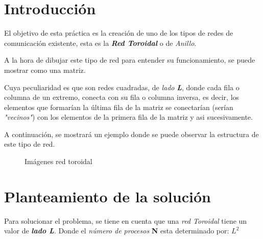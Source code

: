 \documentclass[11pt]{article}
\begin{document}
\section{Introducción}
El objetivo de esta práctica es la creación de uno de los tipos de redes de comunicación existente, esta es la \textbf{\textit{Red Toroidal}} \cite{transpas} o de \textit{Anillo}.

A la hora de dibujar este tipo de red para entender su funcionamiento, se puede mostrar como una matriz. 

Cuya peculiaridad es que son redes cuadradas, de \textit{lado} \textit{\textbf{L}}, donde cada fila o columna de un extremo, conecta con su fila o columna inversa, es decir, los elementos que formarían la última fila de la matriz se conectarían (serían \textit{"vecinos"}) con los elementos de la primera fila de la matriz y asi sucesivamente.

A continuación, se mostrará un ejemplo donde se puede observar la estructura de este tipo de red.

\begin{figure}[h!]
  \centering
  \caption{Imágenes red toroidal}
  \label{fig:toroide}
\end{figure}

\clearpage


\section{Planteamiento de la solución}
Para solucionar el problema, se tiene en cuenta que una \textit{red Toroidal} tiene un valor de \textit{\textbf{lado L}}.
Donde el \textit{número de procesos} \textbf{N} esta determinado por: \textbf{$L^{2}$}
\end{document}

